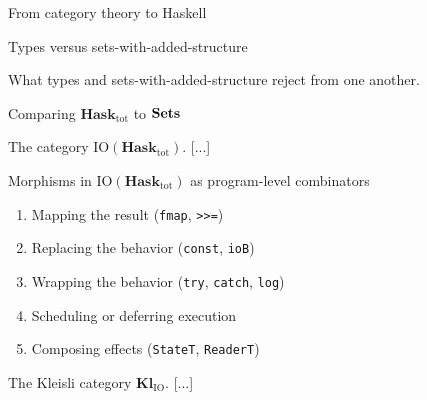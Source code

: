 \documentclass[11pt, a4paper]{article}
\begin{document}
\begin{section}{From category theory to Haskell}
\begin{subsection}{Types versus sets-with-added-structure}
\begin{subsubsection}{What types and sets-with-added-structure reject from one another.}
\end{subsubsection}

\end{subsection}

\begin{subsection}{Comparing $\mathbf{Hask}_\text{tot}$ to $\bold{Sets}$}
\end{subsection}

\begin{subsection}{The category $\text{IO}(\mathbf{Hask}_\text{tot})$.}
[...]

\begin{subsubsection}{Morphisms in $\text{IO}(\mathbf{Hask}_{\text{tot}})$ as program-level combinators}
\begin{enumerate}
\item
Mapping the result (\texttt{fmap}, \texttt{>>=})
\item
Replacing the behavior (\texttt{const}, \texttt{ioB})
\item
Wrapping the behavior (\texttt{try}, \texttt{catch}, \texttt{log})
\item
Scheduling or deferring execution
\item
Composing effects (\texttt{StateT}, \texttt{ReaderT})
\end{enumerate}
\end{subsubsection}

\end{subsection}

\begin{subsection}{The Kleisli category $\mathbf{Kl}_\text{IO}$.}
[...]
\end{subsection}

\end{section}




\end{document}
